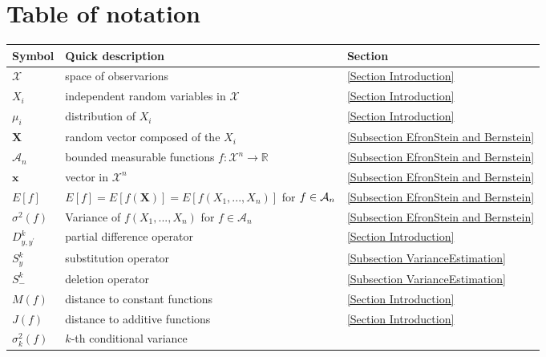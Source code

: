 \documentclass[final,12pt]{colt2018} %
\begin{document}
						\section{Table of notation}
						
						\bigskip
						\begin{tabular}{|l|l|l|}
							\hline
							Symbol & Quick description & Section \\ 
							\hline
							\hline
							$\mathcal{X}$ & space of observarions & \ref{Section Introduction} \\ 
							$X_{i}$ & independent random variables in $\mathcal{X}$ & \ref{Section
								Introduction} \\ 
							$\mu _{i}$ & distribution of $X_{i}$ & \ref{Section Introduction} \\ 
							$\mathbf{X}$ & random vector composed of the $X_{i}$ & \ref{Subsection
								EfronStein and Bernstein} \\ 
							$\mathcal{A}_{n}$ & bounded measurable functions $f:\mathcal{X}%
							^{n}\rightarrow 
							\mathbb{R}
							$ & \ref{Subsection EfronStein and Bernstein} \\ 
							$\mathbf{x}$ & vector in $\mathcal{X}^{n}$ & \ref{Subsection EfronStein and
								Bernstein} \\ 
							$E\left[ f\right] $ & $E\left[ f\right] =E\left[ f\left( \mathbf{X}\right) %
							\right] =E\left[ f\left( X_{1},...,X_{n}\right) \right] $ for $f\in \mathcal{%
								A}_{n}$ & \ref{Subsection EfronStein and Bernstein} \\ 
							$\sigma ^{2}\left( f\right) $ & Variance of $f\left( X_{1},...,X_{n}\right) $
							for $f\in \mathcal{A}_{n}$ & \ref{Subsection EfronStein and Bernstein} \\ 
							$D_{y,y^{\prime }}^{k}$ & partial difference operator & \ref{Section
								Introduction} \\ 
							$S_{y}^{k}$ & substitution operator & \ref{Subsection VarianceEstimation} \\ 
							$S_{-}^{k}$ & deletion operator & \ref{Subsection VarianceEstimation} \\ 
							$M\left( f\right) $ & distance to constant functions & \ref{Section
								Introduction} \\ 
							$J\left( f\right) $ & distance to additive functions & \ref{Section
								Introduction} \\ 
							$\sigma _{k}^{2}\left( f\right) $ & $k$-th conditional variance & \ref%

\end{tabular}
\end{document}
